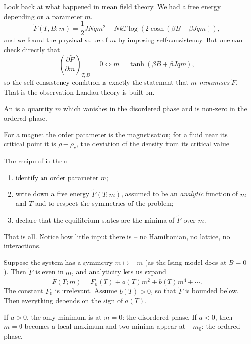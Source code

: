 Look back at what happened in mean field theory. We had a free energy depending on a parameter $m$,
$$
\tilde F(T,B;m) = \frac 12 JNqm^2 - Nk T\log\left(2\cosh(\beta B + \beta Jqm)\right),
$$
and we found the physical value of $m$ by imposing self-consistency. But one can check directly that
$$
\left(\frac{\partial \tilde F}{\partial m}\right)_{T,B} = 0 \iff m = \tanh(\beta B + \beta Jqm),
$$
so the self-consistency condition is exactly the statement that $m$ \emph{minimises} $\tilde F$. That is the observation Landau theory is built on.

\begin{definition}
	An  is a quantity $m$ which vanishes in the disordered phase and is non-zero in the ordered phase.
\end{definition}

For a magnet the order parameter is the magnetisation; for a fluid near its critical point it is $\rho - \rho_c$, the deviation of the density from its critical value.

The recipe of  is then:
\begin{enumerate}[label=(\roman*)]
	\item identify an order parameter $m$;
	\item write down a free energy $\tilde F(T; m)$, assumed to be an \emph{analytic} function of $m$ and $T$ and to respect the symmetries of the problem;
	\item declare that the equilibrium states are the minima of $\tilde F$ over $m$.
\end{enumerate}
That is all. Notice how little input there is -- no Hamiltonian, no lattice, no interactions.

Suppose the system has a symmetry $m \mapsto -m$ (as the Ising model does at $B = 0$). Then $\tilde F$ is even in $m$, and analyticity lets us expand
$$
\tilde F(T;m) = F_0(T) + a(T)m^2 + b(T)m^4 + \cdots.
$$
The constant $F_0$ is irrelevant. Assume $b(T)>0$, so that $\tilde F$ is bounded below. Then everything depends on the sign of $a(T)$.

If $a > 0$, the only minimum is at $m = 0$: the disordered phase. If $a<0$, then $m=0$ becomes a local maximum and two minima appear at $\pm m_0$: the ordered phase.

